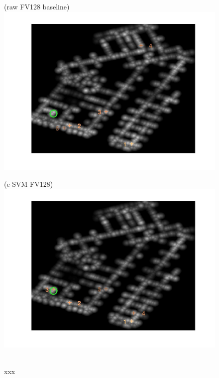 \documentclass[10pt,onecolumn,A4]{article}
\begin{document}
\begin{figure}
	\begin{minipage}{0.45\linewidth}
		\center
		(raw FV128 baseline) \\
		\includegraphics[trim = 55mm 40mm 55mm 25mm, clip=true,width=\linewidth]{sup1812/heatRaw.jpg}
	\end{minipage} 
	\begin{minipage}{0.45\linewidth}
		\center
		(e-SVM FV128) \\
		\includegraphics[trim = 55mm 40mm 55mm 25mm, clip=true,width=\linewidth]{sup1812/heatSvm.jpg}
	\end{minipage} 
	\\
	\textcolor{myWhite}{xxx}\\

\end{figure}
\end{document}

